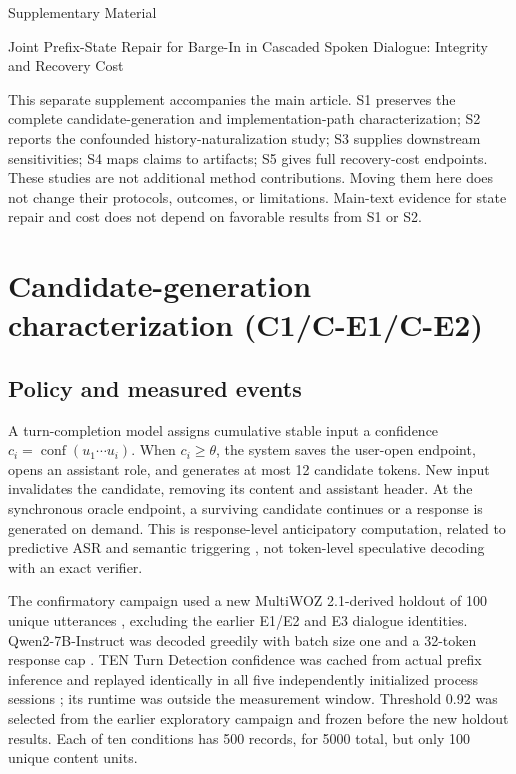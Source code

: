 \documentclass[12pt]{article}
\begin{document}
\raggedbottom
\begin{center}
{\Large Supplementary Material}\par\medskip
{\large Joint Prefix-State Repair for Barge-In in Cascaded Spoken Dialogue: Integrity and Recovery Cost}\par{}
\end{center}

This separate supplement accompanies the main article. S1 preserves the complete candidate-generation and implementation-path characterization; S2 reports the confounded history-naturalization study; S3 supplies downstream sensitivities; S4 maps claims to artifacts; S5 gives full recovery-cost endpoints. These studies are not additional method contributions. Moving them here does not change their protocols, outcomes, or limitations. Main-text evidence for state repair and cost does not depend on favorable results from S1 or S2.

\section{Candidate-generation characterization (C1/C-E1/C-E2)}
\label{sec:s-candidate}

\subsection{Policy and measured events}

A turn-completion model assigns cumulative stable input a confidence $c_i=\operatorname{conf}(u_1\cdots u_i)$. When $c_i\geq\theta$, the system saves the user-open endpoint, opens an assistant role, and generates at most 12 candidate tokens. New input invalidates the candidate, removing its content and assistant header. At the synchronous oracle endpoint, a surviving candidate continues or a response is generated on demand. This is response-level anticipatory computation, related to predictive ASR and semantic triggering \citep{schwarz2023PersonalizedPredictiveASR,zou2026LTSVoiceAgent,mai2026RelayS2S}, not token-level speculative decoding with an exact verifier.

The confirmatory campaign used a new MultiWOZ 2.1-derived holdout of 100 unique utterances \citep{eric2020MultiWOZ21}, excluding the earlier E1/E2 and E3 dialogue identities. Qwen2-7B-Instruct was decoded greedily with batch size one and a 32-token response cap \citep{yang2024Qwen2}. TEN Turn Detection confidence was cached from actual prefix inference and replayed identically in all five independently initialized process sessions \citep{tenFramework2025TurnDetection}; its runtime was outside the measurement window. Threshold 0.92 was selected from the earlier exploratory campaign and frozen before the new holdout results. Each of ten conditions has 500 records, for 5000 total, but only 100 unique content units.
\end{document}
